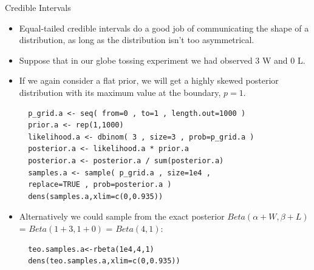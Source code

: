 \documentclass[handout]{beamer}
\begin{document}
\begin{frame}[fragile]{Credible Intervals}
\scriptsize{
\begin{itemize}

\item Equal-tailed credible intervals do a good job of communicating the shape of a distribution, as long as the distribution isn't too
asymmetrical.

\item Suppose that in our globe tossing experiment we had observed 3 W and 0 L.

\item If we again consider a flat prior, we will get a highly skewed posterior distribution with its maximum value at the boundary, $p = 1$.

\begin{verbatim}
  p_grid.a <- seq( from=0 , to=1 , length.out=1000 )
  prior.a <- rep(1,1000)
  likelihood.a <- dbinom( 3 , size=3 , prob=p_grid.a )
  posterior.a <- likelihood.a * prior.a
  posterior.a <- posterior.a / sum(posterior.a)
  samples.a <- sample( p_grid.a , size=1e4 , 
  replace=TRUE , prob=posterior.a )
  dens(samples.a,xlim=c(0,0.935))
\end{verbatim}

\item Alternatively we could sample from the exact posterior $Beta(\alpha + W , \beta + L)$ = $Beta(1 + 3 , 1 + 0)$ = $Beta(4,1)$:

\begin{verbatim}
  teo.samples.a<-rbeta(1e4,4,1)
  dens(teo.samples.a,xlim=c(0,0.935))
\end{verbatim}


\end{itemize}



} 

\end{frame}
\end{document}
